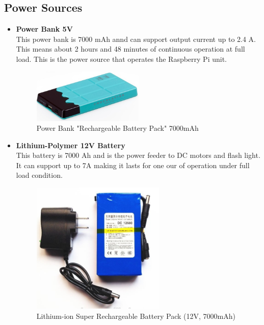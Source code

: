 \documentclass[12pt]{book}
\begin{document}
\subsection{Power Sources}
\begin{itemize}

	\item \textbf{Power Bank 5V}\\
	This power bank is 7000 mAh annd can support output current up to 2.4 A. This means about 2 hours and 48 minutes of continuous operation at full load. This is the power source that operates the Raspberry Pi unit.
	\begin{figure}
		\centering
		\includegraphics[width =0.5\textwidth]{Fig/Electronics/power-bank.jpg}
		\caption{Power Bank "Rechargeable Battery Pack" 7000mAh}
		\label{fig:powerbank}
	\end{figure}

	\item \textbf{Lithium-Polymer 12V Battery}\\
	This battery is 7000 Ah and is the power feeder to DC motors and flash light. It can support up to 7A making it lasts for one our of operation under full load condition.
	\begin{figure}
		\centering
		\includegraphics[width =0.6\textwidth]{Fig/Electronics/bat12.jpg}
		\caption{Lithium-ion Super Rechargeable Battery Pack (12V, 7000mAh)}
		\label{fig:bat12}
	\end{figure}
	

\end{itemize}
\end{document}
